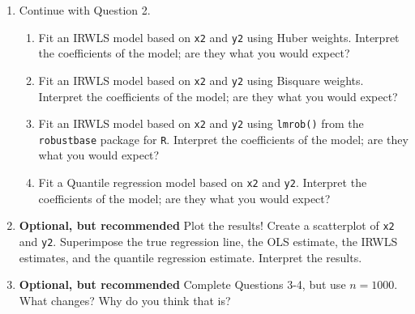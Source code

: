 \documentclass{article}\usepackage[]{graphicx}\usepackage[]{xcolor}
\begin{document}
\begin{enumerate}
\begin{enumerate}
	\item Fit an OLS model based on \texttt{x2} and \texttt{y2}. Check the assumptions of the model and interpret the 
	coefficients of the model; are they what you would expect?
\end{enumerate}
\item Continue with Question 2.
\begin{enumerate}
  \item Fit an IRWLS model based on \texttt{x2} and \texttt{y2} using Huber 
  weights. Interpret the coefficients of the model; are they what you would expect?
  \item Fit an IRWLS model based on \texttt{x2} and \texttt{y2} using Bisquare 
  weights. Interpret the coefficients of the model; are they what you would expect?
  \item Fit an IRWLS model based on \texttt{x2} and \texttt{y2} using \texttt{lmrob()} 
  from the \texttt{robustbase} package for \texttt{R}. Interpret the coefficients 
  of the model; are they what you would expect?
  \item Fit a Quantile regression model based on \texttt{x2} and \texttt{y2}.
  Interpret the coefficients of the model; are they what you would expect?
\end{enumerate}
\item \textbf{Optional, but recommended} Plot the results! Create a scatterplot
of \texttt{x2} and \texttt{y2}. Superimpose the true regression line, the OLS
estimate, the IRWLS estimates, and the quantile regression estimate. Interpret
the results.
\item \textbf{Optional, but recommended} Complete Questions 3-4, but use $n=1000$.
What changes? Why do you think that is?

\end{enumerate}

\end{document}
